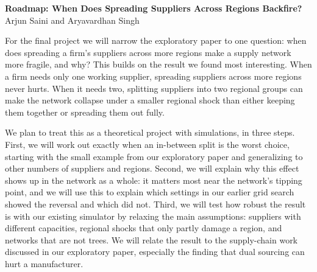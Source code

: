\documentclass[11pt]{article}
\begin{document}
\begin{center}
{\large\bfseries Roadmap: When Does Spreading Suppliers Across Regions Backfire?}\\[4pt]
Arjun Saini and Aryavardhan Singh
\end{center}

For the final project we will narrow the exploratory paper to one question: when does spreading a firm's suppliers across more regions make a supply network more fragile, and why? This builds on the result we found most interesting. When a firm needs only one working supplier, spreading suppliers across more regions never hurts. When it needs two, splitting suppliers into two regional groups can make the network collapse under a smaller regional shock than either keeping them together or spreading them out fully.

We plan to treat this as a theoretical project with simulations, in three steps. First, we will work out exactly when an in-between split is the worst choice, starting with the small example from our exploratory paper and generalizing to other numbers of suppliers and regions. Second, we will explain why this effect shows up in the network as a whole: it matters most near the network's tipping point, and we will use this to explain which settings in our earlier grid search showed the reversal and which did not. Third, we will test how robust the result is with our existing simulator by relaxing the main assumptions: suppliers with different capacities, regional shocks that only partly damage a region, and networks that are not trees. We will relate the result to the supply-chain work discussed in our exploratory paper, especially the finding that dual sourcing can hurt a manufacturer.
\end{document}

